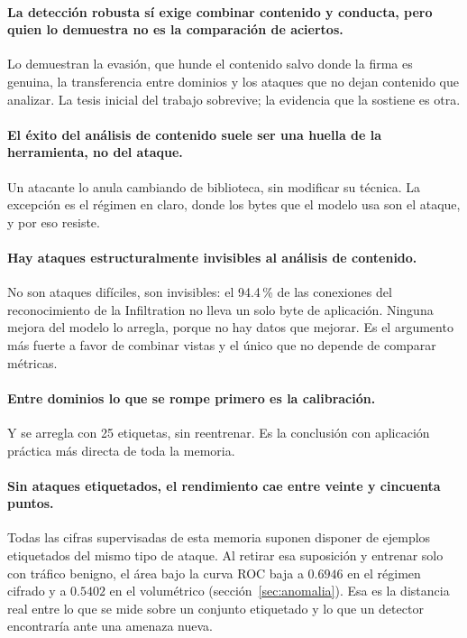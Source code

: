 \paragraph{La detección robusta sí exige combinar contenido y conducta, pero
quien lo demuestra no es la comparación de aciertos.} Lo demuestran la evasión,
que hunde el contenido salvo donde la firma es genuina, la transferencia entre
dominios y los ataques que no dejan contenido que analizar. La tesis inicial del
trabajo sobrevive; la evidencia que la sostiene es otra.

\paragraph{El éxito del análisis de contenido suele ser una huella de la
herramienta, no del ataque.} Un atacante lo anula cambiando de biblioteca, sin
modificar su técnica. La excepción es el régimen en claro, donde los bytes que
el modelo usa son el ataque, y por eso resiste.

\paragraph{Hay ataques estructuralmente invisibles al análisis de contenido.} No
son ataques difíciles, son invisibles: el 94.4\,\% de las conexiones del
reconocimiento de la Infiltration no lleva un solo byte de aplicación. Ninguna
mejora del modelo lo arregla, porque no hay datos que mejorar. Es el argumento
más fuerte a favor de combinar vistas y el único que no depende de comparar
métricas.

\paragraph{Entre dominios lo que se rompe primero es la calibración.} Y se
arregla con 25 etiquetas, sin reentrenar. Es la conclusión con aplicación
práctica más directa de toda la memoria.

\paragraph{Sin ataques etiquetados, el rendimiento cae entre veinte y cincuenta
puntos.} Todas las cifras supervisadas de esta memoria suponen disponer de
ejemplos etiquetados del mismo tipo de ataque. Al retirar esa suposición y
entrenar solo con tráfico benigno, el área bajo la curva ROC baja a $0.6946$
en el régimen cifrado y a $0.5402$ en el volumétrico
(sección~\ref{sec:anomalia}). Esa es la distancia real entre lo que se mide sobre
un conjunto etiquetado y lo que un detector encontraría ante una amenaza nueva.

